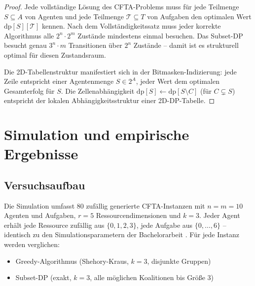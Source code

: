 ﻿\documentclass[a4paper,12pt]{article}
\theoremstyle{definition}
\begin{document}
\begin{proof}
    Jede vollst\"{a}ndige L\"{o}sung des CFTA-Problems muss f\"{u}r jede
    Teilmenge $S \subseteq A$ von Agenten und jede Teilmenge $\mathcal{T} \subseteq T$
    von Aufgaben den optimalen Wert $\mathrm{dp}[S][\mathcal{T}]$ kennen.
    Nach dem Vollst\"{a}ndigkeitssatz \cite{epp2026struktur} muss jeder korrekte
    Algorithmus alle $2^n \cdot 2^m$ Zust\"{a}nde mindestens einmal besuchen.
    Das Subset-DP besucht genau $3^n \cdot m$ Transitionen \"{u}ber $2^n$ Zust\"{a}nde
    -- damit ist es strukturell optimal f\"{u}r diesen Zustandsraum.

    Die 2D-Tabellenstruktur manifestiert sich in der Bitmasken-Indizierung:
    jede Zeile entspricht einer Agentenmenge $S \in 2^A$, jeder Wert dem
    optimalen Gesamterfolg f\"{u}r $S$. Die Zellenabh\"{a}ngigkeit
    $\mathrm{dp}[S] \leftarrow \mathrm{dp}[S \setminus C]$ (f\"{u}r $C \subsetneq S$)
    entspricht der lokalen Abh\"{a}ngigkeitsstruktur einer 2D-DP-Tabelle. \qedhere
\end{proof}

\section{Simulation und empirische Ergebnisse}

\subsection{Versuchsaufbau}

Die Simulation umfasst 80 zuf\"{a}llig generierte CFTA-Instanzen mit
$n = m = 10$ Agenten und Aufgaben, $r = 5$ Ressourcendimensionen und $k = 3$.
Jeder Agent erh\"{a}lt jede Ressource zuf\"{a}llig aus $\{0, 1, 2, 3\}$,
jede Aufgabe aus $\{0, \ldots, 6\}$ -- identisch zu den Simulationsparametern
der Bachelorarbeit \cite{epp2026}. F\"{u}r jede Instanz werden verglichen:
\begin{itemize}
    \item Greedy-Algorithmus (Shehory-Kraus, $k = 3$, disjunkte Gruppen)
    \item Subset-DP (exakt, $k = 3$, alle m\"{o}glichen Koalitionen bis Gr\"{o}{\ss}e 3)
\end{itemize}
\end{document}
